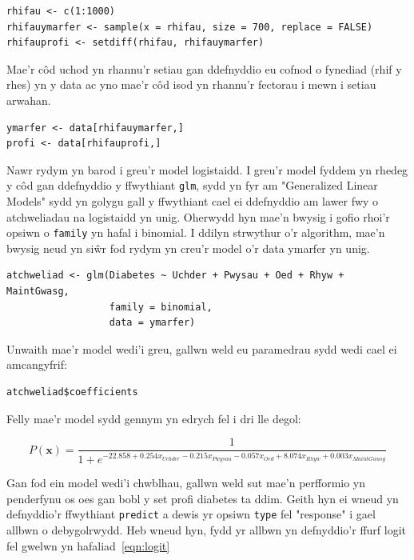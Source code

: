\begin{verbatim}
rhifau <- c(1:1000)
rhifauymarfer <- sample(x = rhifau, size = 700, replace = FALSE)
rhifauprofi <- setdiff(rhifau, rhifauymarfer)
\end{verbatim}

Mae'r c\^{o}d uchod yn rhannu'r setiau gan ddefnyddio eu cofnod o fynediad (rhif y rhes) yn y data ac yno mae'r c\^{o}d isod yn rhannu'r fectorau i mewn i setiau arwahan.  

\begin{verbatim}
ymarfer <- data[rhifauymarfer,] 
profi <- data[rhifauprofi,]
\end{verbatim}

Nawr rydym yn barod i greu'r model logistaidd. I greu'r model fyddem yn rhedeg y c\^{o}d gan ddefnyddio y ffwythiant \texttt{glm}, sydd yn fyr am "Generalized Linear Models" sydd yn golygu gall y ffwythiant cael ei ddefnyddio am lawer fwy o atchweliadau na logistaidd yn unig. Oherwydd hyn mae'n bwysig i gofio rhoi'r opsiwn o \texttt{family} yn hafal i binomial. I ddilyn strwythur o'r algorithm, mae'n bwysig neud yn si\^{w}r fod rydym yn creu'r model o'r data ymarfer yn unig. 

\begin{verbatim}
atchweliad <- glm(Diabetes ~ Uchder + Pwysau + Oed + Rhyw + MaintGwasg,
                  family = binomial,
                  data = ymarfer)
\end{verbatim}

Unwaith mae'r model wedi'i greu, gallwn weld eu paramedrau sydd wedi cael ei amcangyfrif:

\begin{verbatim}
atchweliad$coefficients
\end{verbatim}



Felly mae'r model sydd gennym yn edrych fel i dri lle degol:

$$ P(\mathbf{x}) = \frac{1}{1 + e^{-22.858 + 0.254 x_{Uchder} - 0.215 x_{Pwysau} - 0.057 x_{Oed} + 8.074 x_{Rhyw} + 0.003 x_{MaintGwasg}}} $$

Gan fod ein model wedi'i chwblhau, gallwn weld sut mae'n perfformio yn penderfynu os oes gan bobl y set profi diabetes ta ddim. Geith hyn ei wneud yn defnyddio'r ffwythiant \texttt{predict} a dewis yr opsiwn \texttt{type} fel "response" i gael allbwn o debygolrwydd. Heb wneud hyn, fydd yr allbwn yn defnyddio'r ffurf logit fel gwelwn yn hafaliad~\ref{eqn:logit}

